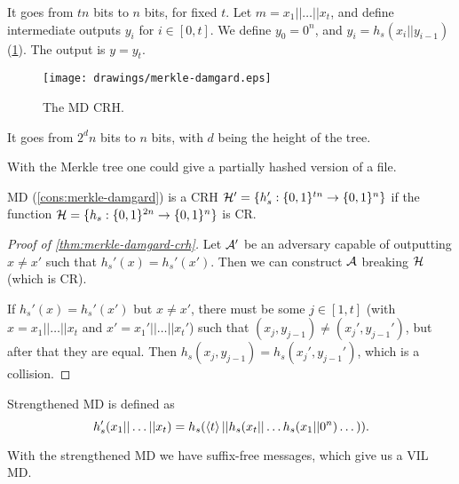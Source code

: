 \begin{construction}[\acl{MD}] \label{cons:merkle-damgard}
	It goes from $tn$ bits to $n$ bits, for fixed $t$.
	Let $m = x_1 || \dots || x_t$, and define intermediate outputs $y_i$ for $i \in [0,t]$.
	We define $y_0 = 0^n$, and $y_i = h_s(x_i || y_{i-1})$ (\cref{fig:merkle-damgard}).
	The output is $y = y_t$.
	\begin{figure}
		\centering
		\texttt{[image: drawings/merkle-damgard.eps]}
		\caption{The \acl{MD} \acl{CRH}.}
		\label{fig:merkle-damgard}
	\end{figure}
\end{construction}

\begin{construction}
	It goes from $2^d n$ bits to $n$ bits, with $d$ being the height of the tree.
\end{construction}
With the Merkle tree one could give a partially hashed version of a file.

\begin{theorem} \label{thm:merkle-damgard-crh}
	\ac{MD} (\cref{cons:merkle-damgard}) is a \ac{CRH} $\mathcal{H}' = \{ h_s' : \{0,1\}^{tn} \to \{0,1\}^{n} \}$ if the function $\mathcal{H} = \{ h_s : \{0,1\}^{2n} \to \{0,1\}^{n} \}$ is \ac{CR}.
\end{theorem}

\begin{proof}[Proof of \cref{thm:merkle-damgard-crh}]
	Let $\mathcal{A}'$ be an adversary capable of outputting $x \neq x'$ such that $h_s'(x) = h_s'(x')$.
	Then we can construct $\mathcal{A}$ breaking $\mathcal{H}$ (which is \ac{CR}).

	If $h_s'(x) = h_s'(x')$ but $x \neq x'$, there must be some $j \in [1,t]$ (with $x = x_1 || \dots || x_t$ and $x' = x_1' || \dots || x_t'$) such that $(x_j, y_{j-1}) \neq (x_j', y_{j-1}')$, but after that they are equal.
	Then $h_s(x_j, y_{j-1}) = h_s(x_j', y_{j-1}')$, which is a collision.
\end{proof}

\begin{construction} \label{cons:strengthened-merkle-damgard}
	Strengthened \ac{MD} is defined as
	\begin{equation*}
		h_s'(x_1 || \dots || x_t) =
		h_s(\left< {t} \right> || h_s(x_t || \dots h_s(x_1 || 0^n) \dots)). \qedhere
	\end{equation*}
\end{construction}
With the strengthened \ac{MD} we have suffix-free messages, which give us a \ac{VIL} \ac{MD}.

